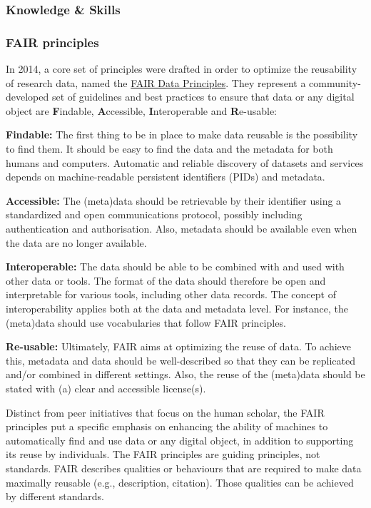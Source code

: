 \documentclass{article}
\begin{document}
\subsubsection{Knowledge \& Skills}\label{knowledge--skills}



\subsubsection{\textbf{FAIR principles}}\label{fair-principles}



In 2014, a core set of principles were drafted in order to optimize the reusability of research data, named the \href{https://www.force11.org/group/fairgroup/fairprinciples}{FAIR Data Principles}. They represent a community-developed set of guidelines and best practices to ensure that data or any digital object are \textbf{F}indable, \textbf{A}ccessible, \textbf{I}nteroperable and \textbf{R}e-usable:


\textbf{Findable:} The first thing to be in place to make data reusable is the possibility to find them. It should be easy to find the data and the metadata for both humans and computers. Automatic and reliable discovery of datasets and services depends on machine-readable persistent identifiers (PIDs) and metadata.


\textbf{Accessible:} The (meta)data should be retrievable by their identifier using a standardized and open communications protocol, possibly including authentication and authorisation. Also, metadata should be available even when the data are no longer available.


\textbf{Interoperable:} The data should be able to be combined with and used with other data or tools. The format of the data should therefore be open and interpretable for various tools, including other data records. The concept of interoperability applies both at the data and metadata level. For instance, the (meta)data should use vocabularies that follow FAIR principles.


\textbf{Re-usable:} Ultimately, FAIR aims at optimizing the reuse of data. To achieve this, metadata and data should be well-described so that they can be replicated and/or combined in different settings. Also, the reuse of the (meta)data should be stated with (a) clear and accessible license(s).


Distinct from peer initiatives that focus on the human scholar, the FAIR principles put a specific emphasis on enhancing the ability of machines to automatically find and use data or any digital object, in addition to supporting its reuse by individuals. The FAIR principles are guiding principles, not standards. FAIR describes qualities or behaviours that are required to make data maximally reusable (e.g., description, citation). Those qualities can be achieved by different standards.
\end{document}
